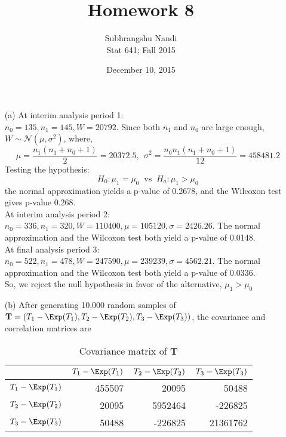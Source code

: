 \documentclass[11pt,a4paper]{article}
\begin{document}
\title{Homework 8}
\author{Subhrangshu Nandi\\
  Stat 641; Fall 2015}
\date{December 10, 2015}

\maketitle

\begin{enumerate}
\item[(a)] At interim analysis period 1:\\
$n_0 = 135, n_1 = 145, W = 20792$. Since both $n_1$ and $n_0$ are large enough, $W \sim \mathcal{N}(\mu,\sigma^2)$, where, 
\[ \mu = \frac{n_1(n_1 + n_0 + 1)}{2} = 20372.5, \ \ \sigma^2 = \frac{n_0 n_1(n_1 + n_0 + 1)}{12} = 458481.2\] 
Testing the hypothesis: 
\[ H_0: \mu_1 = \mu_0\ \text{  vs  } \ H_a: \mu_1 > \mu_0\]
the normal approximation yields a p-value of 0.2678, and the Wilcoxon test gives p-value 0.268. \\
\noindent
At interim analysis period 2:\\
$n_0 = 336, n_1 = 320, W = 110400, \mu = 105120, \sigma = 2426.26$. The normal approximation and the Wilcoxon test both yield a p-value of 0.0148. \\
\noindent
At final analysis period 3:\\
$n_0 = 522, n_1 = 478, W = 247590, \mu = 239239, \sigma = 4562.21$. The normal approximation and the Wilcoxon test both yield a p-value of 0.0336. \\
So, we reject the null hypothesis in favor of the alternative, $\mu_1 > \mu_0$
\item[(b)] After generating 10,000 random samples of $\mathbf{T} = (T_1 - \Exp(T_1), T_2 - \Exp(T_2), T_3 - \Exp(T_3))$, the covariance and correlation matrices are
\begin{table}[H]
\centering
\begin{tabular}{rrrr}
  \hline
& $T_1 - \Exp(T_1)$ & $T_2 - \Exp(T_2)$ & $T_3 - \Exp(T_3)$ \\ 
  \hline
$T_1 - \Exp(T_1)$ & 455507 & 20095 & 50488 \\ 
$T_2 - \Exp(T_2)$ & 20095 & 5952464 & -226825 \\ 
$T_3 - \Exp(T_3)$ & 50488 & -226825 & 21361762 \\ 
  \hline
\end{tabular}
\caption{Covariance matrix of $\mathbf{T}$}
\end{table}

\end{enumerate}
\end{document}
